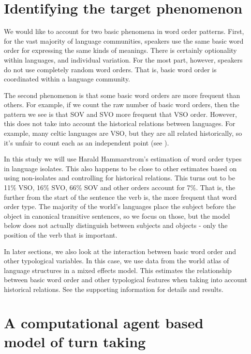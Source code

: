 \documentclass[12pt]{article}
\begin{document}
\section{Identifying the target phenomenon}

We would like to account for two basic phenomena in word order patterns.  First, for the vast majority of language communities, speakers use the same basic word order for expressing the same kinds of meanings.  There is certainly optionality within languages, and individual variation.  For the most part, however, speakers do not use completely random word orders.  That is, basic word order is coordinated within a language community.

The second phenomenon is that some basic word orders are more frequent than others.  For example, if we count the raw number of basic word orders, then the pattern we see is that SOV and SVO more frequent that VSO order.  However, this does not take into account the historical relations between languages.  For example, many celtic languages are VSO, but they are all related historically, so it's unfair to count each as an independent point (see \citealp{Roberts_Winters_2013}).
  
In this study we will use Harald Hammarstrom's estimation of word order types in language isolates.  This also happens to be close to other estimates based on using non-isolates and controlling for historical relations.  This turns out to be 11\% VSO, 16\% SVO, 66\% SOV and other orders account for 7\%.  That is, the further from the start of the sentence the verb is, the more frequent that word order type.  The majority of the world's languages place the subject before the object in canonical transitive sentences, so we focus on those, but the model below does not actually distinguish between subjects and objects - only the position of the verb that is important.

In later sections, we also look at the interaction between basic word order and other typological variables.  In this case, we use data from the world atlas of language structures \citep{WALS2} in a mixed effects model.  This estimates the relationship between basic word order and other typological features when taking into account historical relations.  See the supporting information for details and results.


\section{A computational agent based model of turn taking}
\end{document}
